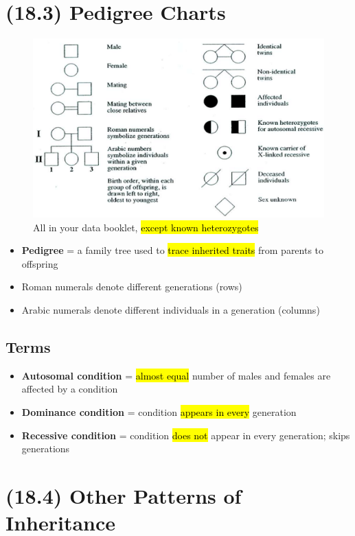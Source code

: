 \documentclass[a4paper,12pt]{article}
\begin{document}
\section{(18.3) Pedigree Charts}
\begin{figure}[H]
    \centering
    \includegraphics[width=\textwidth]{pedigree}
    \caption{All in your data booklet, \hl{except known heterozygotes}}
\end{figure}
\begin{itemize}
    \item{\textbf{Pedigree} = a family tree used to \hl{trace inherited traits} from parents to offspring}
    \item{Roman numerals denote different generations (rows)}
    \item{Arabic numerals denote different individuals in a generation (columns)}
\end{itemize}

\subsection{Terms}
\begin{itemize}
    \item{\textbf{Autosomal condition} = \hl{almost equal} number of males and females are affected by a condition}
    \item{\textbf{Dominance condition} = condition \hl{appears in every} generation}
    \item{\textbf{Recessive condition} = condition \hl{does not} appear in every generation; skips generations}
\end{itemize}

\section{(18.4) Other Patterns of Inheritance}
\end{document}
